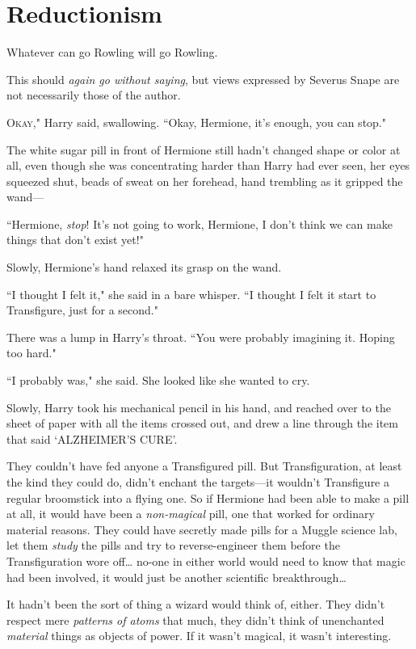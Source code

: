 \chapter{Reductionism}

\begin{chapterOpeningAuthorNote}
Whatever can go Rowling will go Rowling.

This should \emph{again go without saying}, but views expressed by Severus Snape are not necessarily those of the author.
\end{chapterOpeningAuthorNote}

\lettrine[ante=``]{O}{kay,"} Harry said, swallowing. ``Okay, Hermione, it's enough, you can stop."

The white sugar pill in front of Hermione still hadn't changed shape or color at all, even though she was concentrating harder than Harry had ever seen, her eyes squeezed shut, beads of sweat on her forehead, hand trembling as it gripped the wand—

``Hermione, \emph{stop}! It's not going to work, Hermione, I don't think we can make things that don't exist yet!"

Slowly, Hermione's hand relaxed its grasp on the wand.

``I thought I felt it," she said in a bare whisper. ``I thought I felt it start to Transfigure, just for a second."

There was a lump in Harry's throat. ``You were probably imagining it. Hoping too hard."

``I probably was," she said. She looked like she wanted to cry.

Slowly, Harry took his mechanical pencil in his hand, and reached over to the sheet of paper with all the items crossed out, and drew a line through the item that said `ALZHEIMER'S CURE'.

They couldn't have fed anyone a Transfigured pill. But Transfiguration, at least the kind they could do, didn't enchant the targets—it wouldn't Transfigure a regular broomstick into a flying one. So if Hermione had been able to make a pill at all, it would have been a \emph{non-magical} pill, one that worked for ordinary material reasons. They could have secretly made pills for a Muggle science lab, let them \emph{study} the pills and try to reverse-engineer them before the Transfiguration wore off{\ldots} no-one in either world would need to know that magic had been involved, it would just be another scientific breakthrough{\ldots}

It hadn't been the sort of thing a wizard would think of, either. They didn't respect mere \emph{patterns of atoms} that much, they didn't think of unenchanted \emph{material} things as objects of power. If it wasn't magical, it wasn't interesting.

